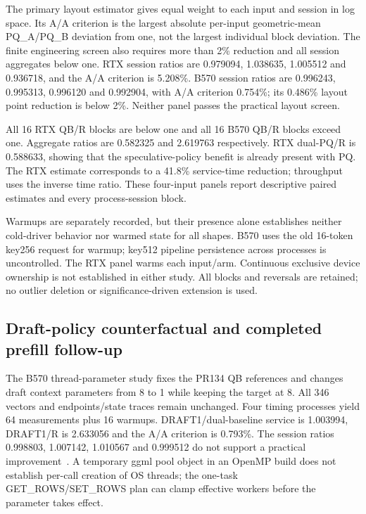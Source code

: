 The primary layout estimator gives equal weight to each input and session in log space. Its A/A criterion is the largest absolute per-input geometric-mean PQ\_A/PQ\_B deviation from one, not the largest individual block deviation. The finite engineering screen also requires more than 2\% reduction and all session aggregates below one. RTX session ratios are 0.979094, 1.038635, 1.005512 and 0.936718, and the A/A criterion is 5.208\%. B570 session ratios are 0.996243, 0.995313, 0.996120 and 0.992904, with A/A criterion 0.754\%; its 0.486\% layout point reduction is below 2\%. Neither panel passes the practical layout screen.

All 16 RTX QB/R blocks are below one and all 16 B570 QB/R blocks exceed one. Aggregate ratios are 0.582325 and 2.619763 respectively. RTX dual-PQ/R is 0.588633, showing that the speculative-policy benefit is already present with PQ. The RTX estimate corresponds to a 41.8\% service-time reduction; throughput uses the inverse time ratio. These four-input panels report descriptive paired estimates and every process-session block.

Warmups are separately recorded, but their presence alone establishes neither cold-driver behavior nor warmed state for all shapes. B570 uses the old 16-token key256 request for warmup; key512 pipeline persistence across processes is uncontrolled. The RTX panel warms each input/arm. Continuous exclusive device ownership is not established in either study. All blocks and reversals are retained; no outlier deletion or significance-driven extension is used.

\subsection{Draft-policy counterfactual and completed prefill follow-up}
The B570 thread-parameter study fixes the PR134 QB references and changes draft context parameters from 8 to 1 while keeping the target at 8. All 346 vectors and endpoints/state traces remain unchanged. Four timing processes yield 64 measurements plus 16 warmups. DRAFT1/dual-baseline service is 1.003994, DRAFT1/R is 2.633056 and the A/A criterion is 0.793\%. The session ratios 0.998803, 1.007142, 1.010567 and 0.999512 do not support a practical improvement~\cite{b570policyrecords}. A temporary ggml pool object in an OpenMP build does not establish per-call creation of OS threads; the one-task GET\_ROWS/SET\_ROWS plan can clamp effective workers before the parameter takes effect.


